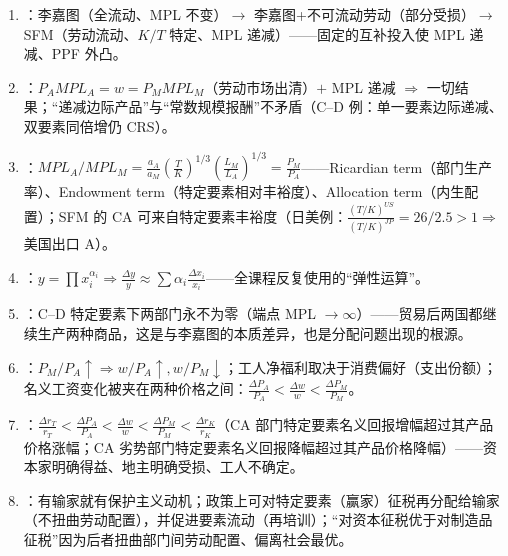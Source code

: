 \begin{sumbox}
\begin{enumerate}
  \item {}：李嘉图（全流动、MPL 不变）$\to$ 李嘉图+不可流动劳动（部分受损）$\to$ SFM（劳动流动、$K/T$ 特定、MPL 递减）——固定的互补投入使 MPL 递减、PPF 外凸。
  \item {}：$P_A MPL_A = w = P_M MPL_M$（劳动市场出清）$+$ MPL 递减 $\Rightarrow$ 一切结果；``递减边际产品''与``常数规模报酬''不矛盾（C--D 例：单一要素边际递减、双要素同倍增仍 CRS）。
  \item {}：$MPL_A/MPL_M = \frac{a_A}{a_M} (\frac{T}{K})^{1/3} (\frac{L_M}{L_A})^{1/3} = \frac{P_M}{P_A}$——Ricardian term（部门生产率）、Endowment term（特定要素相对丰裕度）、Allocation term（内生配置）；SFM 的 CA 可来自特定要素丰裕度（日美例：$\frac{(T/K)^{US}}{(T/K)^{JP}} = 26/2.5 > 1 \Rightarrow$ 美国出口 A）。
  \item {}：$y = \prod x_i^{\alpha_i} \Rightarrow \frac{\Delta y}{y} \approx \sum \alpha_i \frac{\Delta x_i}{x_i}$——全课程反复使用的``弹性运算''。
  \item {}：C--D 特定要素下两部门永不为零（端点 MPL $\to \infty$）——贸易后两国都继续生产两种商品，这是与李嘉图的本质差异，也是分配问题出现的根源。
  \item {}：$P_M/P_A \uparrow \Rightarrow w/P_A \uparrow, w/P_M \downarrow$；工人净福利取决于消费偏好（支出份额）；名义工资变化被夹在两种价格之间：$\frac{\Delta P_A}{P_A} < \frac{\Delta w}{w} < \frac{\Delta P_M}{P_M}$。
  \item {}：$\frac{\Delta r_T}{r_T} < \frac{\Delta P_A}{P_A} < \frac{\Delta w}{w} < \frac{\Delta P_M}{P_M} < \frac{\Delta r_K}{r_K}$（CA 部门特定要素名义回报增幅超过其产品价格涨幅；CA 劣势部门特定要素名义回报降幅超过其产品价格降幅）——资本家明确得益、地主明确受损、工人不确定。
  \item {}：有输家就有保护主义动机；政策上可对特定要素（赢家）征税再分配给输家（不扭曲劳动配置），并促进要素流动（再培训）；``对资本征税优于对制造品征税''因为后者扭曲部门间劳动配置、偏离社会最优。
\end{enumerate}
\end{sumbox}
